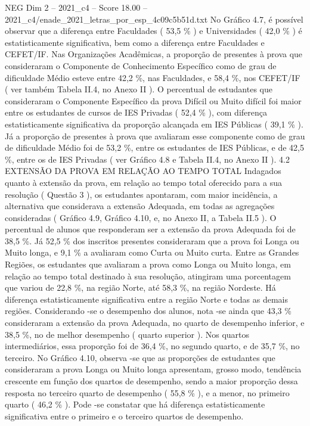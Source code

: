 \begin{textsample}{NEG Dim 2 – 2021\_c4 – Score 18.00 – 2021\_c4/enade\_2021\_letras\_por\_esp\_4c09c5b51d.txt}
No Gráfico 4.7, é possível observar que a diferença entre Faculdades ( 53,5 \% ) e Universidades ( 42,0 \% ) é estatisticamente significativa, bem como a diferença entre Faculdades e CEFET/IF.
Nas Organizações Acadêmicas, a proporção de presentes à prova que consideraram o Componente de Conhecimento Específico como de grau de dificuldade Médio esteve entre 42,2 \%, nas Faculdades, e 58,4 \%, nos CEFET/IF ( ver também Tabela II.4, no Anexo II ).
O percentual de estudantes que consideraram o Componente Específico da prova Difícil ou Muito difícil foi maior entre os estudantes de cursos de IES Privadas ( 52,4 \% ), com diferença estatisticamente significativa da proporção alcançada em IES Públicas ( 39,1 \% ).
Já a proporção de presentes à prova que avaliaram esse componente como de grau de dificuldade Médio foi de 53,2 \%, entre os estudantes de IES Públicas, e de 42,5 \%, entre os de IES Privadas ( ver Gráfico 4.8 e Tabela II.4, no Anexo II ). 4.2 EXTENSÃO DA PROVA EM RELAÇÃO AO TEMPO TOTAL Indagados quanto à extensão da prova, em relação ao tempo total oferecido para a sua resolução ( Questão 3 ), os estudantes apontaram, com maior incidência, a alternativa que considerava a extensão Adequada, em todas as agregações consideradas ( Gráfico 4.9, Gráfico 4.10, e, no Anexo II, a Tabela II.5 ).
O percentual de alunos que responderam ser a extensão da prova Adequada foi de 38,5 \%.
Já 52,5 \% dos inscritos presentes consideraram que a prova foi Longa ou Muito longa, e 9,1 \% a avaliaram como Curta ou Muito curta.
Entre as Grandes Regiões, os estudantes que avaliaram a prova como Longa ou Muito longa, em relação ao tempo total destinado à sua resolução, atingiram uma porcentagem que variou de 22,8 \%, na região Norte, até 58,3 \%, na região Nordeste.
Há diferença estatisticamente significativa entre a região Norte e todas as demais regiões.
Considerando -se o desempenho dos alunos, nota -se ainda que 43,3 \% consideraram a extensão da prova Adequada, no quarto de desempenho inferior, e 38,5 \%, no de melhor desempenho ( quarto superior ).
Nos quartos intermediários, essa proporção foi de 36,4 \%, no segundo quarto, e de 35,7 \%, no terceiro.
No Gráfico 4.10, observa -se que as proporções de estudantes que consideraram a prova Longa ou Muito longa apresentam, grosso modo, tendência crescente em função dos quartos de desempenho, sendo a maior proporção dessa resposta no terceiro quarto de desempenho ( 55,8 \% ), e a menor, no primeiro quarto ( 46,2 \% ).
Pode -se constatar que há diferença estatisticamente significativa entre o primeiro e o terceiro quartos de desempenho.

\end{textsample}

